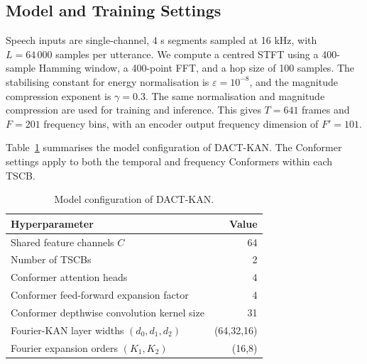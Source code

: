 \documentclass[a4paper,fleqn]{cas-sc}
\begin{document}


\subsection{Model and Training Settings}
\label{sec:settings}



Speech inputs are single-channel, 4 s segments sampled at 16 kHz, with $L=64\,000$ samples per utterance. We compute a centred STFT using a 400-sample Hamming window, a 400-point FFT, and a hop size of 100 samples. The stabilising constant for energy normalisation is $\varepsilon=10^{-8}$, and the magnitude compression exponent is $\gamma=0.3$. The same normalisation and magnitude compression are used for training and inference. This gives $T=641$ frames and $F=201$ frequency bins, with an encoder output frequency dimension of $F'=101$.



Table~\ref{tab:arch} summarises the model configuration of DACT-KAN. The Conformer settings apply to both the temporal and frequency Conformers within each TSCB.



\begin{table}[pos=htbp]
  \centering
  \caption{Model configuration of DACT-KAN.}
  \label{tab:arch}
  \small
  \begin{tabular}{lr}
    \toprule
    Hyperparameter & Value \\
    \midrule
    Shared feature channels $C$ & 64 \\
    Number of TSCBs & 2 \\
    Conformer attention heads & 4 \\
    Conformer feed-forward expansion factor & 4 \\
    Conformer depthwise convolution kernel size & 31 \\
    Fourier-KAN layer widths $(d_0,d_1,d_2)$ & (64,32,16) \\
    Fourier expansion orders $(K_1,K_2)$ & (16,8) \\
    \bottomrule
  \end{tabular}
\end{table}

\end{document}
